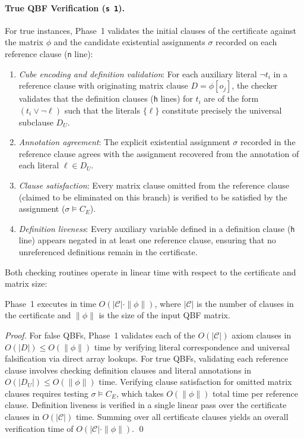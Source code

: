 \documentclass[runningheads]{llncs}
\begin{document}
\paragraph*{True QBF Verification (\texttt{s 1}).}
For true instances, Phase~1 validates the initial clauses of the certificate against the matrix $\phi$ and the candidate existential assignments $\sigma$ recorded on each reference clause (\texttt{n} line):
\begin{enumerate}
    \item \emph{Cube encoding and definition validation}: For each auxiliary literal $\neg t_i$ in a reference clause with originating matrix clause $D = \phi[o_j]$, the checker validates that the definition clauses (\texttt{h} lines) for $t_i$ are of the form $(t_i \lor \neg\ell)$ such that the literals $\{\ell\}$ constitute precisely the universal subclause $D_U$.
    \item \emph{Annotation agreement}: The explicit existential assignment $\sigma$ recorded in the reference clause agrees with the assignment recovered from the annotation of each literal $\ell \in D_U$.
    \item \emph{Clause satisfaction}: Every matrix clause omitted from the reference clause (claimed to be eliminated on this branch) is verified to be satisfied by the assignment ($\sigma \models C_E$).
    \item \emph{Definition liveness}: Every auxiliary variable defined in a definition clause (\texttt{h} line) appears negated in at least one reference clause, ensuring that no unreferenced definitions remain in the certificate.
\end{enumerate}

Both checking routines operate in linear time with respect to the certificate and matrix size:
\begin{theorem}
    \label{thm:checking-complexity}
    Phase~1 executes in time $O(|\mathcal{C}| \cdot \|\phi\|)$, where $|\mathcal{C}|$ is the number of clauses in the certificate and $\|\phi\|$ is the size of the input QBF matrix.
\end{theorem}
\begin{proof}
    For false QBFs, Phase~1 validates each of the $O(|\mathcal{C}|)$ axiom clauses in $O(|D|) \le O(\|\phi\|)$ time by verifying literal correspondence and universal falsification via direct array lookups.
    For true QBFs, validating each reference clause involves checking definition clauses and literal annotations in $O(|D_U|) \le O(\|\phi\|)$ time.
    Verifying clause satisfaction for omitted matrix clauses requires testing $\sigma \models C_E$, which takes $O(\|\phi\|)$ total time per reference clause.
    Definition liveness is verified in a single linear pass over the certificate clauses in $O(|\mathcal{C}|)$ time.
    Summing over all certificate clauses yields an overall verification time of $O(|\mathcal{C}| \cdot \|\phi\|)$.
    \qed
\end{proof}
\end{document}
